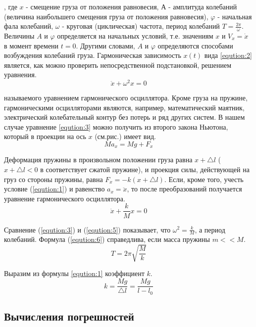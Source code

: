, где $x$ - смещение груза от положения равновесия, $А$ - амплитуда колебаний (величина наибольшего смещения груза от положения равновесия), $\varphi$ - начальная фала колебаний, $\omega$ - круговая (циклическая) частота, период колебаний $T = \frac{2 \pi}{\omega}$. Величины $A$ и $\varphi$ определяется на начальных условий, т.е. значениям $x$ и $V_x = \dot{x}$ в момент времени $t = 0$. Другими словами, $A$ и $\varphi$ определяются способами возбуждения колебаний груза.
Гармоническая зависимость $x(t)$ вида \ref{eqution:2} является, как можно проверить непосредственной подстановкой, решением уравнения.
\begin{equation}
	\label{eqution:3}
	\ddot{x} + \omega ^ 2 x = 0
\end{equation} 

называемого уравнением гармонического осциллятора. Кроме груза на пружине, гармоническими осцилляторами являются, например, математический маятник, электрический колебательный контур без потерь и ряд других систем.
В нашем случае уравнение \ref{eqution:3} можно получить из второго закона Ньютона, который в проекции на ось $x$ (см.рис.) имеет вид.
\begin{equation}
	\label{eqution:4}
	Ma_x = Mg + F_x
\end{equation}

Деформация пружины в произвольном положении груза равна $x + \triangle l$ ($x + \triangle l < 0$ в соответствует сжатой пружине), и проекция силы, действующей на груз со стороны пружины, равна $F_x = -k(x + \triangle l)$. Если, кроме того, учесть условие (\ref{eqution:1}) и равенство $a_x = \ddot{x}$, то после преобразований получается уравнение гармонического осциллятора.
\begin{equation}
	\label{eqution:5}
	\ddot{x} + \frac{k}{M} x = 0 
\end{equation}

Сравнение (\ref{eqution:3}) и (\ref{eqution:5}) показывает, что $\omega ^2 = \frac{k}{M}$, а период колебаний. Формула (\ref{eqution:6}) справедлива, если масса пружины $m << M$.
\begin{equation}
	\label{eqution:6}
	T = 2 \pi \sqrt{\frac{M}{k}}
\end{equation}

Выразим из формулы \ref{eqution:1} коэффициент $k$.
\begin{equation}
	\label{eqution:7}
	k = \frac{Mg}{\triangle l} = \frac{Mg}{l - l_0}
\end{equation}

\subsection{Вычисления погрешностей}

